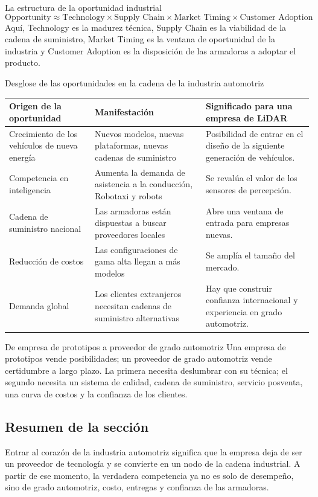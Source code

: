 \begin{importantbox}{La estructura de la oportunidad industrial}
\[
\text{Opportunity} \approx \text{Technology} \times \text{Supply Chain} \times \text{Market Timing} \times \text{Customer Adoption}
\]
Aquí, Technology es la madurez técnica, Supply Chain es la viabilidad de la cadena de suministro, Market Timing es la ventana de oportunidad de la industria y Customer Adoption es la disposición de las armadoras a adoptar el producto.
\end{importantbox}

\begin{knowledgebox}{Desglose de las oportunidades en la cadena de la industria automotriz}
\begin{tabularx}{\textwidth}{p{}p{}X}
\toprule
Origen de la oportunidad & Manifestación & Significado para una empresa de LiDAR \\
\midrule
Crecimiento de los vehículos de nueva energía & Nuevos modelos, nuevas plataformas, nuevas cadenas de suministro & Posibilidad de entrar en el diseño de la siguiente generación de vehículos. \\
Competencia en inteligencia & Aumenta la demanda de asistencia a la conducción, Robotaxi y robots & Se revalúa el valor de los sensores de percepción. \\
Cadena de suministro nacional & Las armadoras están dispuestas a buscar proveedores locales & Abre una ventana de entrada para empresas nuevas. \\
Reducción de costos & Las configuraciones de gama alta llegan a más modelos & Se amplía el tamaño del mercado. \\
Demanda global & Los clientes extranjeros necesitan cadenas de suministro alternativas & Hay que construir confianza internacional y experiencia en grado automotriz. \\
\bottomrule
\end{tabularx}
\end{knowledgebox}

\begin{importantbox}{De empresa de prototipos a proveedor de grado automotriz}
Una empresa de prototipos vende posibilidades; un proveedor de grado automotriz vende certidumbre a largo plazo. La primera necesita deslumbrar con su técnica; el segundo necesita un sistema de calidad, cadena de suministro, servicio posventa, una curva de costos y la confianza de los clientes.
\end{importantbox}

\subsection{Resumen de la sección}

Entrar al corazón de la industria automotriz significa que la empresa deja de ser un proveedor de tecnología y se convierte en un nodo de la cadena industrial. A partir de ese momento, la verdadera competencia ya no es solo de desempeño, sino de grado automotriz, costo, entregas y confianza de las armadoras.
